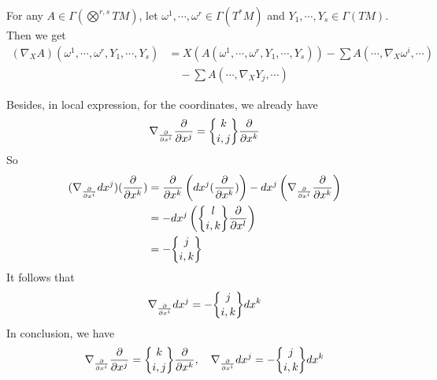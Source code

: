 \begin{enumerate}[label=\arabic{*}.]
	\begin{cor}
		For any $A \in \Gamma(\bigotimes^{r,s}TM)$, let $\omega^1,\cdots,\omega^r \in \Gamma(T^*M)$ and $Y_1,\cdots,Y_s \in \Gamma(TM)$. Then we get
		\begin{equation*}
			\begin{aligned}
				(\nabla_XA)(\omega^1,\cdots,\omega^r,Y_1,\cdots,Y_s) &= X(A(\omega^1,\cdots,\omega^r,Y_1,\cdots,Y_s))-\sum A(\cdots,\nabla_X\omega^i,\cdots)\\
				&\quad - \sum A(\cdots,\nabla_XY_j,\cdots)
			\end{aligned}
		\end{equation*}
	\end{cor}

	\noindent Besides, in local expression, for the coordinates, we already have
	\begin{equation*}
		\nabla_{\frac{\partial}{\partial x^i}}\frac{\partial}{\partial x^j} = \bracenom{k}{i,j}\frac{\partial}{\partial x^k}
	\end{equation*}
	So
	\begin{equation*}
		\begin{aligned}
			(\nabla_{\frac{\partial}{\partial x^i}}dx^j)(\frac{\partial}{\partial x^k}) &= \frac{\partial}{\partial x^k}\bc{dx^j (\frac{\partial}{\partial x^k})} - dx^j\bc{\nabla_{\frac{\partial}{\partial x^i}} \frac{\partial}{\partial x^k}} \\
			&= -dx^j\bc{\bracenom{l}{i,k}\frac{\partial}{\partial x^l}} \\
			&= -\bracenom{j}{i,k}
		\end{aligned}
	\end{equation*}
	It follows that
	\begin{equation*}
		\nabla_{\frac{\partial}{\partial x^i}}dx^j = -\bracenom{j}{i,k}dx^k
	\end{equation*}
	In conclusion, we have
	\begin{equation*}
		\nabla_{\frac{\partial}{\partial x^i}}\frac{\partial}{\partial x^j} = \bracenom{k}{i,j}\frac{\partial}{\partial x^k},\quad \nabla_{\frac{\partial}{\partial x^i}}dx^j = -\bracenom{j}{i,k}dx^k
	\end{equation*}


\end{enumerate}
